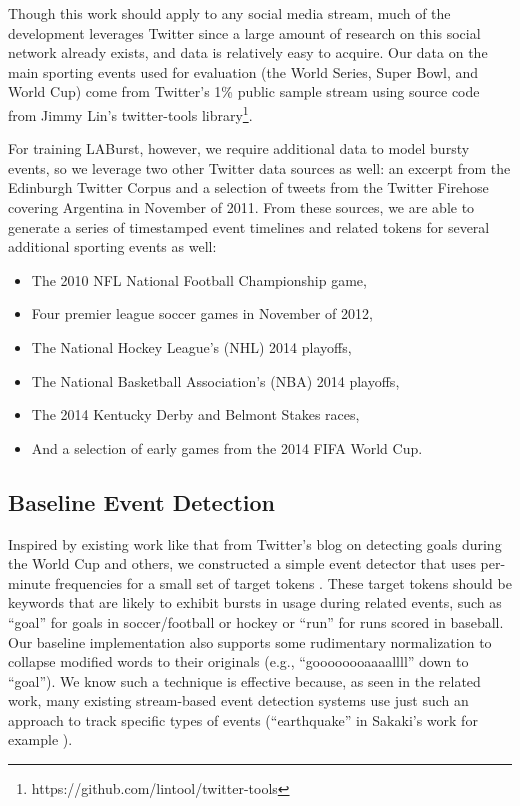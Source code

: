 \documentclass{acm_proc_article-sp}
\begin{document}
Though this work should apply to any social media stream, much of the development leverages Twitter since a large amount of research on this social network already exists, and data is relatively easy to acquire.
Our data on the main sporting events used for evaluation (the World Series, Super Bowl, and World Cup) come from Twitter's 1\% public sample stream using source code from Jimmy Lin's twitter-tools library\footnote{https://github.com/lintool/twitter-tools}.

For training LABurst, however, we require additional data to model bursty events, so we leverage two other Twitter data sources as well: an excerpt from the Edinburgh Twitter Corpus \cite{Petrovic:2010:ETC:1860667.1860680} and a selection of tweets from the Twitter Firehose covering Argentina in November of 2011.
From these sources, we are able to generate a series of timestamped event timelines and related tokens for several additional sporting events as well: 
%
\begin{itemize}
\item The 2010 NFL National Football Championship game, 
\item Four premier league soccer games in November of 2012, %
\item The National Hockey League's (NHL) 2014 playoffs, 
\item The National Basketball Association's (NBA) 2014 playoffs, 
\item The 2014 Kentucky Derby and Belmont Stakes races, 
\item And a selection of early games from the 2014 FIFA World Cup.
\end{itemize}

\subsection{Baseline Event Detection}

Inspired by existing work like that from Twitter's blog on detecting goals during the World Cup and others, we constructed a simple event detector that uses per-minute frequencies for a small set of target tokens \cite{Cipriani2014}. 
These target tokens should be keywords that are likely to exhibit bursts in usage during related events, such as ``goal'' for goals in soccer/football or hockey or ``run'' for runs scored in baseball.
Our baseline implementation also supports some rudimentary normalization to collapse modified words to their originals (e.g., ``goooooooaaaallll'' down to ``goal'').
We know such a technique is effective because, as seen in the related work, many existing stream-based event detection systems use just such an approach to track specific types of events (``earthquake'' in Sakaki's work for example \cite{Sakaki:2010:EST:1772690.1772777}).
\end{document}
